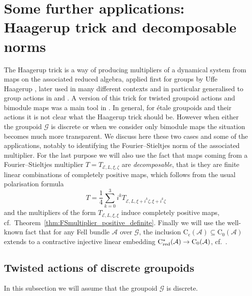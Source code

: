 \documentclass[11 pt, leqno]{amsart}
\numberwithin{equation}{section}
\theoremstyle{plain}
\theoremstyle{definition}
\newcommand*{\contc}{\mathrm{C_c}}%
\newcommand*{\contz}{\mathrm{C_0}}%
\DeclareMathOperator{\red}{red}%
\newcommand{\G}{\mathcal G} %
\newcommand{\EE}{\mathcal E}
\newcommand{\A}{\mathcal A}
\newcommand{\cst}{\ifmmode\mathrm{C}^*\else{$\mathrm{C}^*$}\fi}
\begin{document}
%
%
\section{Some further applications: Haagerup trick and decomposable norms} 
\label{Sec:Applications}

The Haagerup trick is a way of producing multipliers of a dynamical system from maps on the associated reduced algebra, applied first for groups by Uffe Haagerup \cite[Lemma 2.5]{Haagerup}, later used in many different contexts and in particular generalised to group actions in \cite[Proposition 4.12]{BedosConti2} and \cite[Proposition 3.4]{mstt}. 
A version of this trick for twisted groupoid actions and bimodule maps was a main tool in \cite{BartoszKangAdam}. 
In general, for \'etale groupoids and their actions it is not clear what the Haagerup trick should be. 
However when either the groupoid $\G$ is discrete or when we consider only bimodule maps the situation becomes much more transparent. 
We discuss here these two cases and some of the applications, notably to identifying the Fourier--Stieltjes norm of the associated multiplier. 
For the last purpose we will also use the fact that maps coming from a Fourier--Stieltjes multiplier $T = T_{\EE,L,\xi,\zeta}$  are \emph{decomposable}, that is they are finite linear combinations of completely positive maps, which follows from the usual polarisation formula 
\[
    T =\frac{1}{4}\sum_{k=0}^3 i^k T_{\EE,L,\xi+i^k\zeta ,\xi+i^k\zeta}
\]
and the  multipliers of the form $T_{\EE,L,\xi,\xi}$ induce completely positive maps, cf.\ Theorem~\ref{thm:FSmultiplier_positive_definite}. 
Finally we will use the well-known fact that for any  Fell bundle $\A$ over $\G$, 
the inclusion $\contc(\A)\subseteq \contz(\A)$ extends to a contractive injective linear embedding \(\cst_{\red}(\A) \to \contz(\A)\), cf.\ \cite[Proposition 7.10]{BartoszRalf2}.


%
\subsection{Twisted actions of discrete groupoids} 

In this subsection we will assume that the groupoid $\G$ is discrete. 
\end{document}
